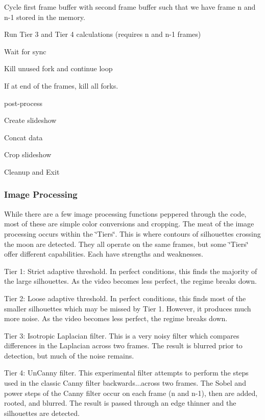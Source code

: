 \begin{DoxyItemize}
\begin{DoxyItemize}
\begin{DoxyItemize}
\item Cycle first frame buffer with second frame buffer such that we have frame n and n-\/1 stored in the memory.
\item Run Tier 3 and Tier 4 calculations (requires n and n-\/1 frames)
\item Wait for sync
\end{DoxyItemize}
\end{DoxyItemize}
\item Kill unused fork and continue loop
\item If at end of the frames, kill all forks.
\item post-\/process
\begin{DoxyItemize}
\item Create slideshow
\item Concat data
\item Crop slideshow
\end{DoxyItemize}
\item Cleanup and Exit
\end{DoxyItemize}

\subsubsection*{Image Processing}

While there are a few image processing functions peppered through the code, most of these are simple color conversions and cropping. The meat of the image processing occurs within the \char`\"{}\+Tiers\char`\"{}. This is where contours of silhouettes crossing the moon are detected. They all operate on the same frames, but some \char`\"{}\+Tiers\char`\"{} offer different capabilities. Each have strengths and weaknesses.


\begin{DoxyItemize}
\item Tier 1\+: Strict adaptive threshold. In perfect conditions, this finds the majority of the large silhouettes. As the video becomes less perfect, the regime breaks down.
\item Tier 2\+: Loose adaptive threshold. In perfect conditions, this finds most of the smaller silhouettes which may be missed by Tier 1. However, it produces much more noise. As the video becomes less perfect, the regime breaks down.
\item Tier 3\+: Isotropic Laplacian filter. This is a very noisy filter which compares differences in the Laplacian across two frames. The result is blurred prior to detection, but much of the noise remains.
\item Tier 4\+: Un\+Canny filter. This experimental filter attempts to perform the steps used in the classic Canny filter backwards...across two frames. The Sobel and power steps of the Canny filter occur on each frame (n and n-\/1), then are added, rooted, and blurred. The result is passed through an edge thinner and the silhouettes are detected.
\end{DoxyItemize}

